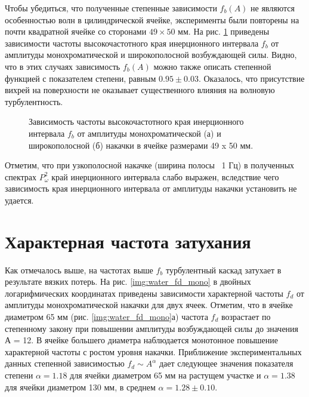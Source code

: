 Чтобы убедиться, что полученные степенные зависимости $f_b(A)$ не являются особенностью волн в цилиндрической 
ячейке, эксперименты были повторены на почти квадратной ячейке со сторонами $49 \times 50$ мм. На рис. \ref{img:water_fb_rect} приведены зависимости частоты высокочастотного края инерционного интервала $f_b$ от амплитуды монохроматической и широкополосной возбуждающей силы. Видно, что в этих случаях зависимость $f_b(A)$ можно также описать степенной функцией с показателем степени, равным $0.95 \pm 0.03$. Оказалось, что присутствие вихрей на поверхности не оказывает существенного влияния на волновую турбулентность.
\begin{figure}[ht]
  \begin{minipage}[ht]{0.49\linewidth}
  \end{minipage}
  \hfill
  \begin{minipage}[ht]{0.49\linewidth}
  \end{minipage}
  \caption{Зависимость частоты высокочастотного края инерционного интервала $f_b$ от амплитуды монохроматической (а) и широкополосной (б) накачки в ячейке размерами 49 x 50 мм.}
  \label{img:water_fb_rect}  
\end{figure}

Отметим, что при узкополосной накачке (ширина полосы ~1 Гц) в полученных спектрах $P^2_\omega$ край инерционного интервала слабо выражен, вследствие чего зависимость края инерционного интервала от амплитуды накачки установить не удается.

\section{Характерная частота затухания}%
Как отмечалось выше, на частотах выше $f_b$ турбулентный каскад затухает в результате вязких потерь. На рис. \ref{img:water_fd_mono} в двойных логарифмических координатах приведены зависимости характерной частоты $f_d$ от амплитуды монохроматической накачки для двух ячеек. Отметим, что в ячейке диаметром 65 мм (рис. \ref{img:water_fd_mono}а) частота $f_d$ возрастает по степенному закону при повышении амплитуды возбуждающей силы до значения А = 12. В ячейке большего диаметра наблюдается монотонное повышение характерной частоты с ростом уровня накачки. Приближение экспериментальных данных степенной зависимостью $f_d \sim A^\alpha$ дает следующее значения показателя степени $\alpha = 1.18$ для ячейки диаметром 65 мм на растущем участке и $\alpha = 1.38$ для ячейки диаметром 130 мм, в среднем $\alpha = 1.28 \pm 0.10$.

